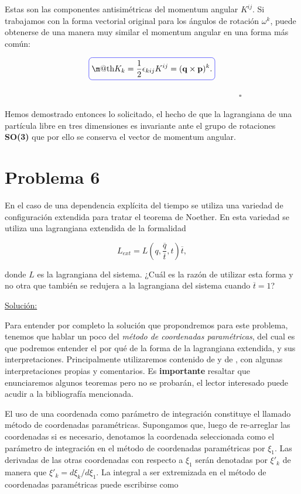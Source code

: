 \documentclass[a4paper,10pt]{article}
\makeatletter
\numberwithin{equation}{section}
\newcommand*{\boxcolor}{blue}
\renewcommand{\boxed}[1]{\textcolor{\boxcolor}{%
\tikz[baseline={([yshift=-1ex]current bounding box.center)}] \node [rectangle, minimum width=1ex,rounded corners,draw] {\normalcolor\m@th$\displaystyle#1$};}}
\makeatother
\begin{document}
Estas son las componentes antisimétricas del momentum angular $K^{ij}$. Si trabajamos 
con la forma vectorial original para los ángulos de rotación $\omega^k$, puede obtenerse 
de una manera muy similar el momentum angular en una forma más común:

\begin{equation}
 \boxed{K_k = \frac{1}{2}\epsilon_{kij}K^{ij} = (\mathbf{q} \times \mathbf{p})^k.}
\end{equation}

$\hspace{12cm} \square$

Hemos demostrado entonces lo solicitado, el hecho de que  la lagrangiana de
una partícula libre en tres dimensiones es invariante ante el grupo de rotaciones 
\textbf{SO(3)} que por ello se conserva el vector de momentum angular.

\section{Problema 6}

En el caso de una dependencia explícita del tiempo se utiliza una variedad de configuración 
extendida para tratar el teorema de Noether. En esta variedad se utiliza una lagrangiana 
extendida de la formalidad

$$
L_{ext} = L(q,\frac{\overline{q}}{\overline{t}},t)\overline{t},
$$

donde $L$ es la lagrangiana del sistema. ¿Cuál es la razón de utilizar esta forma y no 
otra que también se redujera a la lagrangiana del sistema cuando $\overline{t}=1$?

\vspace{.3cm}

\underline{Solución:} \vspace{.3cm}

Para entender por completo la solución que propondremos para este problema, tenemos que 
hablar un poco del \emph{método de coordenadas paramétricas}, del cual es que podremos 
entender el por qué de la forma de la lagrangiana extendida, y sus interpretaciones. Principalmente
utilizaremos contenido de \cite{johns} y de \cite{greiner}, con algunas interpretaciones 
propias y comentarios. Es \textbf{importante} resaltar que enunciaremos algunos teoremas 
pero no se probarán, el lector interesado puede acudir a la bibliografía mencionada.

\vspace{.3cm}

El uso de una coordenada como parámetro de integración constituye el llamado 
método de coordenadas paramétricas. Supongamos que, luego de re-arreglar las coordenadas 
si es necesario, denotamos la coordenada seleccionada como el parámetro de integración 
en el método de coordenadas paramétricas por $\xi_1$. Las derivadas de las otras coordenadas 
con respecto a $\xi_1$ serán denotadas por $\xi'_k$ de manera que $\xi'_k = d\xi_k/d\xi_1$. La integral 
a ser extremizada en el método de coordenadas paramétricas puede escribirse como
\end{document}
